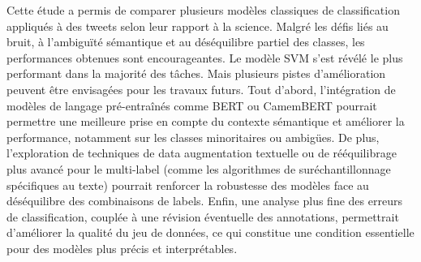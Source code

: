 Cette étude a permis de comparer plusieurs modèles classiques de classification appliqués à des tweets selon leur rapport à la science.
Malgré les défis liés au bruit, à l’ambiguïté sémantique et au déséquilibre partiel des classes, les performances obtenues sont encourageantes.
Le modèle SVM s’est révélé le plus performant dans la majorité des tâches.
Mais plusieurs pistes d’amélioration peuvent être envisagées pour les travaux futurs.
Tout d’abord, l’intégration de modèles de langage pré-entraînés comme BERT ou CamemBERT pourrait permettre une meilleure prise en compte du contexte sémantique et améliorer la performance, notamment sur les classes minoritaires ou ambigües.
De plus, l’exploration de techniques de data augmentation textuelle ou de rééquilibrage plus avancé pour le multi-label (comme les algorithmes de suréchantillonnage spécifiques au texte) pourrait renforcer la robustesse des modèles face au déséquilibre des combinaisons de labels.
Enfin, une analyse plus fine des erreurs de classification, couplée à une révision éventuelle des annotations, permettrait d’améliorer la qualité du jeu de données, ce qui constitue une condition essentielle pour des modèles plus précis et interprétables.

